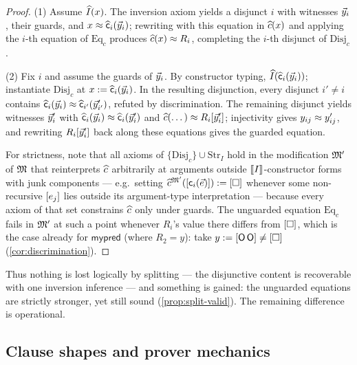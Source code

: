 \begin{proof}
(1) Assume $\widehat{I}(x)$.  The inversion axiom yields a disjunct $i$ with
witnesses $\vec{y}_i$, their guards, and $x \approx
\widehat{\mathsf{c}}_i(\vec{y}_i)$; rewriting with this equation in
$\widehat{c}(x)$ and applying the $i$-th equation of $\mathrm{Eq}_c$
produces $\widehat{c}(x) \approx R_i$, completing the $i$-th disjunct of
$\mathrm{Disj}_c$.

(2) Fix $i$ and assume the guards of $\vec{y}_i$.  By constructor
typing, $\widehat{I}(\widehat{\mathsf{c}}_i(\vec{y}_i))$; instantiate
$\mathrm{Disj}_c$ at $x \mathrel{:=} \widehat{\mathsf{c}}_i(\vec{y}_i)$.  In the
resulting disjunction, every disjunct $i' \neq i$ contains
$\widehat{\mathsf{c}}_i(\vec{y}_i) \approx \widehat{\mathsf{c}}_{i'}(\vec{y}'_{i'})$,
refuted by discrimination.  The remaining disjunct yields witnesses
$\vec{y}'_i$ with $\widehat{\mathsf{c}}_i(\vec{y}_i) \approx
\widehat{\mathsf{c}}_i(\vec{y}'_i)$ and $\widehat{c}(\dots) \approx
R_i[\vec{y}'_i]$; injectivity gives $y_{ij} \approx y'_{ij}$, and rewriting
$R_i[\vec{y}'_i]$ back along these equations gives the guarded equation.

For strictness, note that all axioms of $\{\mathrm{Disj}_c\} \cup
\mathrm{Str}_I$ hold in the modification $\mathfrak{M}'$ of $\mathfrak{M}$ that
reinterprets $\widehat{c}$ arbitrarily at arguments outside
$[\![ I ]\!]_{}$-constructor forms with junk components --- e.g.\ setting
$\widehat{c}^{\mathfrak{M}'}([\mathsf{c}_i(\vec{e})]) \mathrel{:=} [\square]$ whenever
some non-recursive $[e_j]$ lies outside its argument-type
interpretation --- because every axiom of that set constrains
$\widehat{c}$ only under guards.  The unguarded equation $\mathrm{Eq}_c$
fails in $\mathfrak{M}'$ at such a point whenever $R_i$'s value there differs
from $[\square]$, which is the case already for $\mathsf{mypred}$
(where $R_2 = y$): take $y \mathrel{:=} [\mathsf{O}\,\mathsf{O}] \neq [\square]$
(\cref{cor:discrimination}).
\end{proof}

Thus nothing is lost logically by splitting --- the disjunctive content
is recoverable with one inversion inference --- and something is gained:
the unguarded equations are strictly stronger, yet still sound
(\cref{prop:split-valid}).  The remaining difference is operational.

\subsection{Clause shapes and prover mechanics}
\label{sec:casesplit-cnf}

